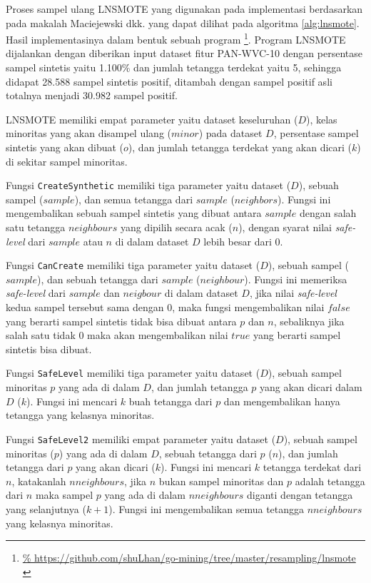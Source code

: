 Proses sampel ulang LNSMOTE yang digunakan pada implementasi berdasarkan
pada makalah Maciejewski dkk.
\cite{maciejewski2011local}
yang dapat dilihat pada algoritma
\ref{alg:lnsmote}.
Hasil implementasinya dalam bentuk sebuah program
\footnote{\url{%
https://github.com/shuLhan/go-mining/tree/master/resampling/lnsmote
}}.
Program LNSMOTE dijalankan dengan diberikan input dataset fitur PAN-WVC-10
dengan persentase sampel sintetis yaitu 1.100\% dan jumlah tetangga terdekat
yaitu 5, sehingga didapat 28.588 sampel sintetis positif, ditambah dengan
sampel positif asli totalnya menjadi 30.982 sampel positif.

	\newpage
	

LNSMOTE memiliki empat parameter yaitu dataset keseluruhan ($D$), kelas
minoritas yang akan disampel ulang ($minor$) pada dataset $D$, persentase
sampel sintetis yang akan dibuat ($o$), dan jumlah tetangga terdekat yang akan
dicari ($k$) di sekitar sampel minoritas.

Fungsi \texttt{CreateSynthetic} memiliki tiga parameter yaitu dataset ($D$),
sebuah sampel ($sample$), dan semua tetangga dari $sample$ ($neighbors$).
Fungsi ini mengembalikan sebuah sampel sintetis yang dibuat antara $sample$
dengan salah satu tetangga $neighbours$ yang dipilih secara acak ($n$), dengan
syarat nilai \textit{safe-level} dari $sample$ atau $n$ di dalam dataset $D$
lebih besar dari $0$.

Fungsi \texttt{CanCreate} memiliki tiga parameter yaitu dataset ($D$), sebuah
sampel ($sample$), dan sebuah tetangga dari $sample$ ($neighbour$).
Fungsi ini memeriksa \textit{safe-level} dari $sample$ dan $neigbour$ di dalam
dataset $D$, jika nilai \textit{safe-level} kedua sampel tersebut sama dengan
0, maka fungsi mengembalikan nilai $false$ yang berarti sampel sintetis tidak
bisa dibuat antara $p$ dan $n$, sebaliknya jika salah satu tidak 0
maka akan mengembalikan nilai $true$ yang berarti sampel sintetis bisa dibuat.

Fungsi \texttt{SafeLevel} memiliki tiga parameter yaitu dataset ($D$), sebuah
sampel minoritas $p$ yang ada di dalam $D$, dan jumlah tetangga $p$ yang akan dicari
dalam $D$ ($k$).
Fungsi ini mencari $k$ buah tetangga dari $p$ dan mengembalikan hanya tetangga
yang kelasnya minoritas.

Fungsi \texttt{SafeLevel2} memiliki empat parameter yaitu dataset ($D$), sebuah
sampel minoritas ($p$) yang ada di dalam $D$, sebuah tetangga dari $p$ ($n$),
dan jumlah tetangga dari $p$ yang akan dicari ($k$).
Fungsi ini mencari $k$ tetangga terdekat dari $n$, katakanlah $nneighbours$,
jika $n$ bukan sampel minoritas dan $p$ adalah tetangga dari $n$ maka sampel
$p$ yang ada di dalam $nneighbours$ diganti dengan tetangga yang selanjutnya
($k+1$).
Fungsi ini mengembalikan semua tetangga $nneighbours$ yang kelasnya minoritas.

